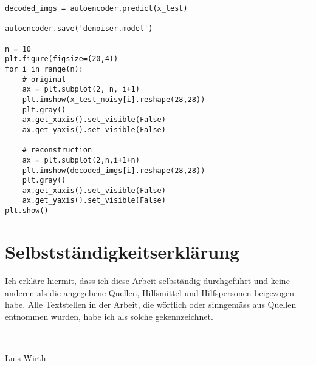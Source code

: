 \begin{appendices}
\begin{verbatim}
decoded_imgs = autoencoder.predict(x_test)

autoencoder.save('denoiser.model')

n = 10
plt.figure(figsize=(20,4))
for i in range(n):
    # original
    ax = plt.subplot(2, n, i+1)
    plt.imshow(x_test_noisy[i].reshape(28,28))
    plt.gray()
    ax.get_xaxis().set_visible(False)
    ax.get_yaxis().set_visible(False)

    # reconstruction
    ax = plt.subplot(2,n,i+1+n)
    plt.imshow(decoded_imgs[i].reshape(28,28))
    plt.gray()
    ax.get_xaxis().set_visible(False)
    ax.get_yaxis().set_visible(False)
plt.show()
\end{verbatim}


\end{appendices}

\printbibliography[heading=bibintoc]
\pagebreak

\listoffigures
\pagebreak

\listoftables
\pagebreak

\chapter*{Selbstständigkeitserklärung}
Ich erkläre hiermit, dass ich diese Arbeit selbständig durchgeführt und keine anderen als die angegebene Quellen, Hilfsmittel und Hilfspersonen beigezogen habe. Alle Textstellen in der Arbeit, die wörtlich oder sinngemäss aus Quellen entnommen wurden, habe ich als solche gekennzeichnet.

\vspace{2cm}
\begin{center}
  \noindent\rule{5cm}{0.4pt}\\
  Luis Wirth
\end{center}



